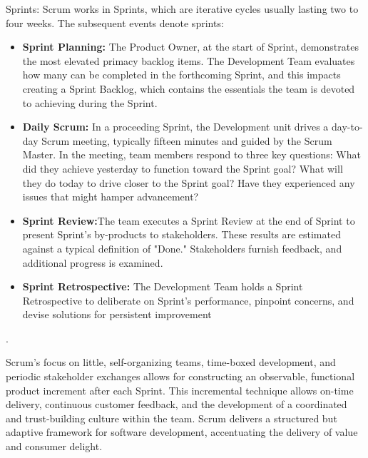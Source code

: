 \documentclass[conference]{IEEEtran}
\begin{document}
Sprints:
Scrum works in Sprints, which are iterative cycles usually lasting two to four weeks. The subsequent events denote sprints\cite{diebold2015practitioners}:

\begin{itemize}
\item \textbf{Sprint Planning:} The Product Owner, at the start of Sprint, demonstrates the most elevated primacy backlog items. The Development Team evaluates how many can be completed in the forthcoming Sprint, and this impacts creating a Sprint Backlog, which contains the essentials the team is devoted to achieving during the Sprint\cite{diebold2015practitioners}\cite{rigby2016secret}.

\item \textbf{Daily Scrum:} In a proceeding Sprint, the Development unit drives a day-to-day Scrum meeting, typically fifteen minutes and guided by the Scrum Master. In the meeting, team members respond to three key questions: What did they achieve yesterday to function toward the Sprint goal? What will they do today to drive closer to the Sprint goal? Have they experienced any issues that might hamper advancement\cite{diebold2015practitioners}?

\item \textbf{Sprint Review:}The team executes a Sprint Review at the end of Sprint to present Sprint's by-products to stakeholders. These results are estimated against a typical definition of "Done." Stakeholders furnish feedback, and additional progress is examined\cite{diebold2015practitioners}\cite{schwaber1997scrum}.

\item \textbf{Sprint Retrospective:} The Development Team holds a Sprint Retrospective to deliberate on Sprint's performance, pinpoint concerns, and devise solutions for persistent improvement\cite{schwaber1997scrum}
\end{itemize}.


Scrum's focus on little, self-organizing teams, time-boxed development, and periodic stakeholder exchanges allows for constructing an observable, functional product increment after each Sprint. This incremental technique allows on-time delivery, continuous customer feedback, and the development of a coordinated and trust-building culture within the team. Scrum delivers a structured but adaptive framework for software development, accentuating the delivery of value and consumer delight\cite{diebold2015practitioners}.
\end{document}
